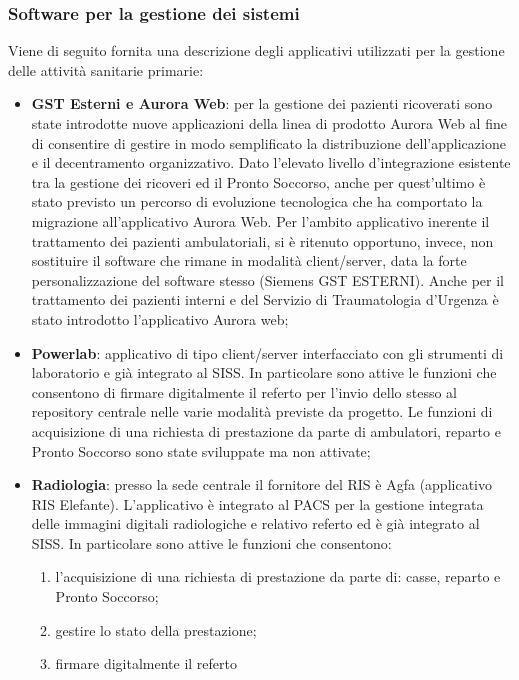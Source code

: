 \documentclass[12pt, a4paper, titlepage]{report}
\begin{document}
	
	\subsubsection{Software per la gestione dei sistemi}
	
	Viene di seguito fornita una descrizione degli applicativi utilizzati per la gestione delle attività sanitarie primarie:
	
	\begin{itemize}
		\item \textbf{GST Esterni e Aurora Web}: per la gestione dei pazienti ricoverati sono state introdotte nuove applicazioni della linea di prodotto Aurora Web al fine di consentire di gestire in modo semplificato la distribuzione dell'applicazione e il decentramento organizzativo. Dato l'elevato livello d'integrazione esistente tra la gestione dei ricoveri ed il Pronto Soccorso, anche per quest'ultimo è stato previsto un percorso di evoluzione tecnologica che ha comportato la migrazione all'applicativo Aurora Web.
		Per l'ambito applicativo inerente il trattamento dei pazienti ambulatoriali, si è ritenuto opportuno, invece, non sostituire il software che rimane in modalità client/server, data la forte personalizzazione del software stesso (Siemens GST ESTERNI). Anche per il trattamento dei pazienti interni e del Servizio di Traumatologia d'Urgenza è stato introdotto l'applicativo Aurora web;
		\item \textbf{Powerlab}: applicativo di tipo client/server interfacciato con gli strumenti di laboratorio e già integrato al SISS. In particolare sono attive le funzioni che consentono di firmare digitalmente il referto per l'invio dello stesso al repository centrale nelle varie modalità previste da progetto. Le funzioni di acquisizione di una richiesta di prestazione da parte di ambulatori, reparto e Pronto Soccorso sono state sviluppate ma non attivate;
		\item \textbf{Radiologia}: presso la sede centrale il fornitore del RIS è Agfa (applicativo RIS Elefante). L'applicativo è integrato al PACS per la gestione integrata delle immagini digitali radiologiche e relativo referto ed è già integrato al SISS. In particolare sono attive le funzioni che consentono: 
			\begin{enumerate}
			\item l'acquisizione di una richiesta di prestazione da parte di: casse, reparto e
			Pronto Soccorso;
			\item  gestire lo stato della prestazione;
			\item firmare digitalmente il referto

\end{enumerate}
\end{itemize}
\end{document}

